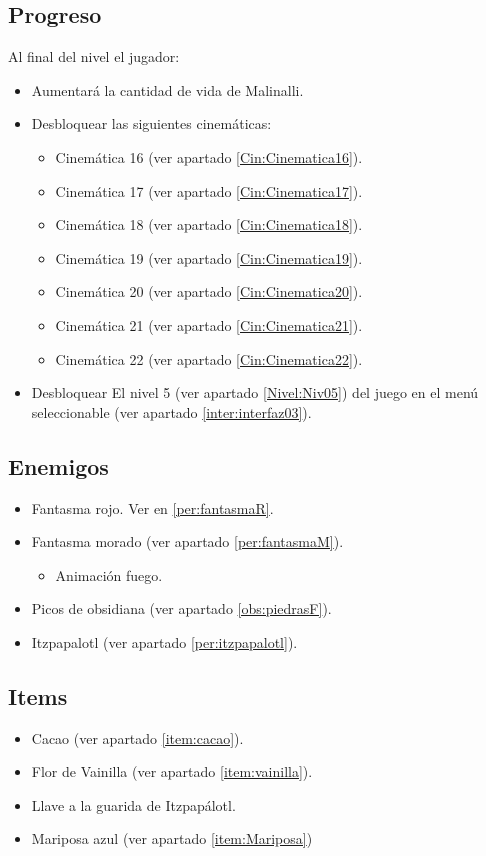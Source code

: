         \subsection{Progreso}
Al final del nivel el jugador:
\begin{itemize}
        \item Aumentará la cantidad de vida de Malinalli.
        \item Desbloquear las siguientes cinemáticas:
		\begin{itemize}
			\item Cinemática 16 (ver apartado \ref{Cin:Cinematica16}).
			\item Cinemática 17 (ver apartado \ref{Cin:Cinematica17}).
			\item Cinemática 18 (ver apartado \ref{Cin:Cinematica18}).
			\item Cinemática 19 (ver apartado \ref{Cin:Cinematica19}).
			\item Cinemática 20 (ver apartado \ref{Cin:Cinematica20}).
			\item Cinemática 21 (ver apartado \ref{Cin:Cinematica21}).
			\item Cinemática 22 (ver apartado \ref{Cin:Cinematica22}).
		\end{itemize}
        \item Desbloquear El nivel 5 (ver apartado \ref{Nivel:Niv05}) del juego en el menú seleccionable (ver apartado \ref{inter:interfaz03}).
\end{itemize}        
        \subsection{Enemigos}
                \begin{itemize}
                    \item Fantasma rojo. Ver en \ref{per:fantasmaR}. 
            
					\item Fantasma morado (ver apartado \ref{per:fantasmaM}).
			\begin{itemize}
				\item Animación fuego.
			\end{itemize}
            \item Picos de obsidiana (ver apartado \ref{obs:piedrasF}).
             \item Itzpapalotl (ver apartado \ref{per:itzpapalotl}).
                \end{itemize}
        \subsection{Items}
                \begin{itemize}
                        \item   Cacao (ver apartado \ref{item:cacao}).
                        \item Flor de Vainilla (ver apartado \ref{item:vainilla}).
                        \item Llave a la guarida de Itzpapálotl.
                        \item Mariposa azul (ver apartado \ref{item:Mariposa})
                \end{itemize}
